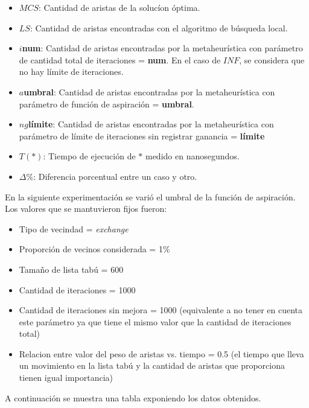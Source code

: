 \begin{itemize}
\item $MCS$: Cantidad de aristas de la solucíon óptima.
\item $LS$: Cantidad de aristas encontradas con el algoritmo de búsqueda
local.
\item $i$\textbf{num}: Cantidad de aristas encontradas por la metaheurística
con parámetro de cantidad total de iteraciones = \textbf{num}. En el caso de
$INF$, se considera que no hay límite de iteraciones.
\item $a$\textbf{umbral}: Cantidad de aristas encontradas por la
metaheurística con parámetro de función de aspiración = \textbf{umbral}.
\item $ng$\textbf{límite}: Cantidad de aristas encontradas por la
metaheurística con parámetro de límite de iteraciones sin registrar ganancia =
\textbf{límite}
\item $T(*)$: Tiempo de ejecución de $*$ medido en nanosegundos.
\item $\Delta \%$: Diferencia porcentual entre un caso y otro.
\end{itemize}

En la siguiente experimentación se varió el umbral de la función de
aspiración. Los valores que se mantuvieron fijos fueron:

\begin{itemize}
\item Tipo de vecindad = \textit{exchange}
\item Proporción de vecinos considerada = 1\%
\item Tamaño de lista tabú = 600
\item Cantidad de iteraciones = 1000
\item Cantidad de iteraciones sin mejora = 1000 (equivalente a no tener en
cuenta este parámetro ya que tiene el mismo valor que la cantidad de
iteraciones total)
\item Relacion entre valor del peso de aristas vs. tiempo = 0.5 (el tiempo que
lleva un movimiento en la lista tabú y la cantidad de aristas que proporciona
tienen igual importancia)
\end{itemize}

A continuación se muestra una tabla exponiendo los datos obtenidos.


